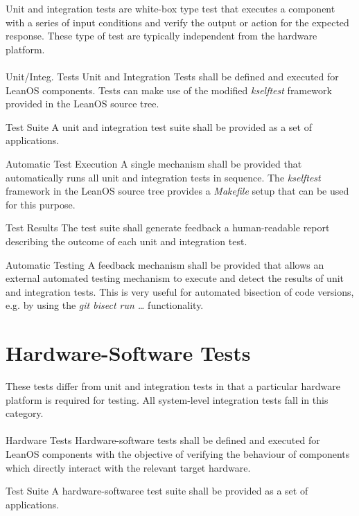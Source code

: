 \noindent
Unit and integration tests are white-box type test that executes a component
with a series of input conditions and verify the output or action for the
expected response. These type of test are typically independent from the
hardware platform.\\
\\

 {Unit/Integ. Tests}{%
Unit and Integration Tests shall be defined and executed for LeanOS components.
}{Tests can make use of the modified \emph{kselftest} framework provided %
in the LeanOS source tree.
}%

 {Test Suite}{%
A unit and integration test suite shall be provided as a set of applications.
}{}%

 {Automatic Test Execution}{%
A single mechanism shall be provided that automatically runs all unit and %
integration tests in sequence.%
}{The \emph{kselftest} framework in the LeanOS source tree provides a %
\emph{Makefile} setup that can be used for this purpose.}%

 {Test Results}{%
The test suite shall generate feedback a human-readable report describing the %
outcome of each unit and integration test.%
}{}

 {Automatic Testing}{%
A feedback mechanism shall be provided that allows an external automated %
testing mechanism to execute and detect the results of unit and integration %
tests.%
}{This is very useful for automated bisection of code versions, e.g. by %
using the \emph{git bisect run \ldots} functionality.}%


\section {Hardware-Software Tests}

These tests differ from unit and integration tests in that a particular hardware
platform is required for testing. All system-level integration tests fall in
this category.\\
\\

 {Hardware Tests}{%
Hardware-software tests shall be defined and executed for LeanOS components %
with the objective of verifying the behaviour of components which directly %
interact with the relevant target hardware.%
}{}

 {Test Suite}{%
A hardware-softwaree test suite shall be provided as a set of applications.
}{}

